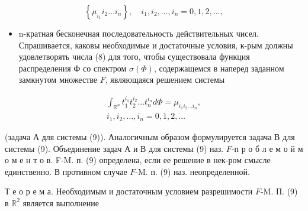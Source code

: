 \documentclass[10pt]{article}
\begin{document}
\[

\left\{\mu_{i_{1}} i_{2} \ldots i_{n}\right\}, \quad i_{1}, i_{2}, \ldots, i_{n}=0,1,2, \ldots,

\]



\begin{itemize}

  \item n-кратная бесконечная последовательность действительных чисел. Спрашивается, каковы необходимые и достаточные условия, к-рым должны удовлетворять числа (8) для того, чтобы существовала функция распределения Ф со спектром $\sigma(\Phi)$, содержащемся в наперед заданном замкнутом множестве $F$, являющаяся решением системы

\end{itemize}



\[

\begin{gathered}

\int_{\mathbb{R}^{n}} t_{1}^{i_{1}} t_{2}^{i_{2}} \ldots t_{n}^{i_{n}} d \Phi=\mu_{i_{1} i_{2} \ldots i_{n}}, \\

i_{1}, i_{2}, \ldots, i_{n}=0,1,2, \ldots

\end{gathered}

\]



(задача А для системы (9)). Аналогичным образом формулируется задача В для системы (9). Объединение задач А и В для системы (9) наз. $F$-п р о б л е м о й м о м е н т о в. F-M. п. (9) определена, если ее решение в нек-ром смысле единственно. В противном случае $F$-M. п. (9) наз. неопределенной.



Т е о р е м а. Необходимым и достаточным условием разрешимости $F$-M. П. (9) в $\mathbb{R}^{2}$ является выполнение
\end{document}
